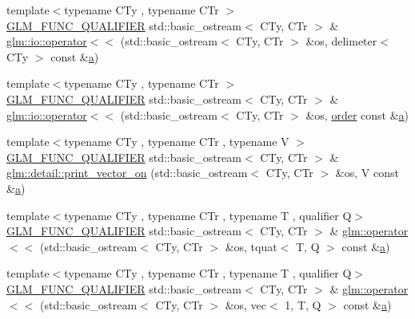 \begin{DoxyCompactItemize}
\item 
{\footnotesize template$<$typename C\+Ty , typename C\+Tr $>$ }\\\hyperlink{setup_8hpp_a33fdea6f91c5f834105f7415e2a64407}{G\+L\+M\+\_\+\+F\+U\+N\+C\+\_\+\+Q\+U\+A\+L\+I\+F\+I\+ER} std\+::basic\+\_\+ostream$<$ C\+Ty, C\+Tr $>$ \& \hyperlink{namespaceglm_1_1io_a7c5774d5b7b03ff810042e141d893082}{glm\+::io\+::operator$<$$<$} (std\+::basic\+\_\+ostream$<$ C\+Ty, C\+Tr $>$ \&os, delimeter$<$ C\+Ty $>$ const \&\hyperlink{_s_d_l__opengl__glext_8h_a3309789fc188587d666cda5ece79cf82}{a})
\item 
{\footnotesize template$<$typename C\+Ty , typename C\+Tr $>$ }\\\hyperlink{setup_8hpp_a33fdea6f91c5f834105f7415e2a64407}{G\+L\+M\+\_\+\+F\+U\+N\+C\+\_\+\+Q\+U\+A\+L\+I\+F\+I\+ER} std\+::basic\+\_\+ostream$<$ C\+Ty, C\+Tr $>$ \& \hyperlink{namespaceglm_1_1io_a4dab7c825ecbd918643ed9fc9ef4ecb6}{glm\+::io\+::operator$<$$<$} (std\+::basic\+\_\+ostream$<$ C\+Ty, C\+Tr $>$ \&os, \hyperlink{_s_d_l__opengl__glext_8h_ac64a59f91026a137ab3ce387f6c7e4a7}{order} const \&\hyperlink{_s_d_l__opengl__glext_8h_a3309789fc188587d666cda5ece79cf82}{a})
\item 
{\footnotesize template$<$typename C\+Ty , typename C\+Tr , typename V $>$ }\\\hyperlink{setup_8hpp_a33fdea6f91c5f834105f7415e2a64407}{G\+L\+M\+\_\+\+F\+U\+N\+C\+\_\+\+Q\+U\+A\+L\+I\+F\+I\+ER} std\+::basic\+\_\+ostream$<$ C\+Ty, C\+Tr $>$ \& \hyperlink{namespaceglm_1_1detail_a9d760c8d2e4e01ac441fcbba7d387055}{glm\+::detail\+::print\+\_\+vector\+\_\+on} (std\+::basic\+\_\+ostream$<$ C\+Ty, C\+Tr $>$ \&os, V const \&\hyperlink{_s_d_l__opengl__glext_8h_a3309789fc188587d666cda5ece79cf82}{a})
\item 
{\footnotesize template$<$typename C\+Ty , typename C\+Tr , typename T , qualifier Q$>$ }\\\hyperlink{setup_8hpp_a33fdea6f91c5f834105f7415e2a64407}{G\+L\+M\+\_\+\+F\+U\+N\+C\+\_\+\+Q\+U\+A\+L\+I\+F\+I\+ER} std\+::basic\+\_\+ostream$<$ C\+Ty, C\+Tr $>$ \& \hyperlink{group__gtx__io_ga0d49970be1b7cdc10a2b027cea97c7e3}{glm\+::operator$<$$<$} (std\+::basic\+\_\+ostream$<$ C\+Ty, C\+Tr $>$ \&os, tquat$<$ T, Q $>$ const \&\hyperlink{_s_d_l__opengl__glext_8h_a3309789fc188587d666cda5ece79cf82}{a})
\item 
{\footnotesize template$<$typename C\+Ty , typename C\+Tr , typename T , qualifier Q$>$ }\\\hyperlink{setup_8hpp_a33fdea6f91c5f834105f7415e2a64407}{G\+L\+M\+\_\+\+F\+U\+N\+C\+\_\+\+Q\+U\+A\+L\+I\+F\+I\+ER} std\+::basic\+\_\+ostream$<$ C\+Ty, C\+Tr $>$ \& \hyperlink{group__gtx__io_ga7a029530f08d465cd95b60186c625aba}{glm\+::operator$<$$<$} (std\+::basic\+\_\+ostream$<$ C\+Ty, C\+Tr $>$ \&os, vec$<$ 1, T, Q $>$ const \&\hyperlink{_s_d_l__opengl__glext_8h_a3309789fc188587d666cda5ece79cf82}{a})

\end{DoxyCompactItemize}
